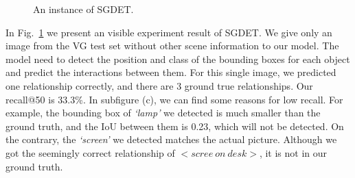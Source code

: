 \begin{figure}[!h]
 	\caption[An instance of SGDET.]{An instance of SGDET.}
 	\label{fig:sgdet}
 \end{figure}
In Fig.~\ref{fig:sgdet}  we present an visible experiment result of SGDET. We give only an image from the VG test set without other scene information to our model. The model need to detect the position and class of the bounding boxes for each object and predict the interactions between them. For this single image, we predicted one relationship correctly, and there are 3 ground true relationships. Our recall@50 is 33.3\%.  In subfigure (c), we can find some reasons for low recall. For example, the bounding box of \textit{`lamp' }we detected is much smaller than the ground truth, and the IoU between them is 0.23, which will not be detected. On the contrary, the \textit{`screen' }we detected matches the actual picture. Although we got the seemingly correct relationship of $ <scree\ on \ desk> $, it is not in our ground truth.
